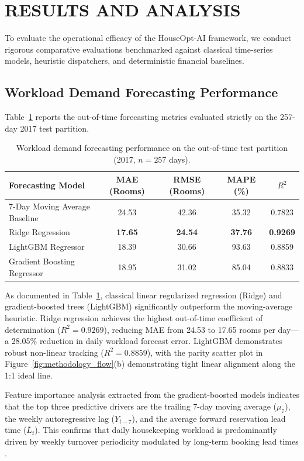 \documentclass[11pt,a4paper]{article}
\begin{document}
\section{RESULTS AND ANALYSIS}

To evaluate the operational efficacy of the HouseOpt-AI framework, we conduct rigorous comparative evaluations benchmarked against classical time-series models, heuristic dispatchers, and deterministic financial baselines.

\subsection{Workload Demand Forecasting Performance}
Table~\ref{tab:forecasting_results} reports the out-of-time forecasting metrics evaluated strictly on the 257-day 2017 test partition.

\begin{table}[h]
\centering
\caption{Workload demand forecasting performance on the out-of-time test partition (2017, $n=257$ days).}
\label{tab:forecasting_results}
\begin{tabular}{lcccc}
\toprule
\textbf{Forecasting Model} & \textbf{MAE (Rooms)} & \textbf{RMSE (Rooms)} & \textbf{MAPE (\%)} & \textbf{$R^2$} \\
\midrule
7-Day Moving Average Baseline & 24.53 & 42.36 & 35.32 & 0.7823 \\
Ridge Regression & \textbf{17.65} & \textbf{24.54} & \textbf{37.76} & \textbf{0.9269} \\
LightGBM Regressor & 18.39 & 30.66 & 93.63 & 0.8859 \\
Gradient Boosting Regressor & 18.95 & 31.02 & 85.04 & 0.8833 \\
\bottomrule
\end{tabular}
\end{table}

As documented in Table~\ref{tab:forecasting_results}, classical linear regularized regression (Ridge) \cite{hoerl1970} and gradient-boosted trees (LightGBM) \cite{chen2016} significantly outperform the moving-average heuristic. Ridge regression achieves the highest out-of-time coefficient of determination ($R^2 = 0.9269$), reducing MAE from 24.53 to 17.65 rooms per day---a 28.05\% reduction in daily workload forecast error. LightGBM demonstrates robust non-linear tracking ($R^2 = 0.8859$), with the parity scatter plot in Figure~\ref{fig:methodology_flow}(b) demonstrating tight linear alignment along the 1:1 ideal line.

Feature importance analysis extracted from the gradient-boosted models indicates that the top three predictive drivers are the trailing 7-day moving average ($\mu_{7}$), the weekly autoregressive lag ($Y_{t-7}$), and the average forward reservation lead time ($\bar{L}_t$). This confirms that daily housekeeping workload is predominantly driven by weekly turnover periodicity modulated by long-term booking lead times \cite{weatherford2003,antonio2019bigdata}.
\end{document}
